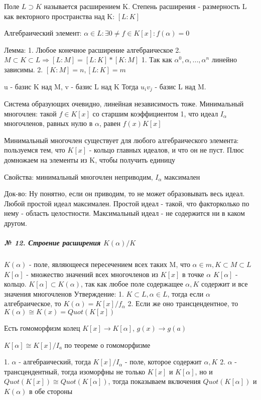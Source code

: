 \documentclass{article}
\begin{document}
\begin{flushleft}

Поле $L \supset K$ называется расширением K.
Степень расширения - размерность L как векторного пространства над K: $[L : K]$

Алгебраический элемент: $\alpha \in L : \exists 0 \neq f \in K[x] : f(\alpha) = 0$

Лемма:
1. Любое конечное расширение алгебраическое
2. $M \subset K \subset L \Rightarrow [L : M] = [L : K] * [K : M]$
1. Так как $\alpha^0, \alpha, ..., \alpha^n$ линейно зависимы.
2. $[K : M] = n, [L : K] = m$

u - базис K над M, v - базис L над K
Тогда $u_iv_j$ - базис L над M.

Система образующих очевидно, линейная независимость тоже.
Минимальный многочлен: такой $f \in K[x]$ со старшим коэффициентом 1, что идеал $I_\alpha$ многочленов, равных нулю в $\alpha$, равен $f(x)K[x]$

Минимальный многочлен существует для любого алгебраического элемента: пользуемся тем, что $K[x]$ - кольцо главных идеалов, и что он не пуст. Плюс домножаем на элементы из K, чтобы получить единицу

Свойства: минимальный многочлен неприводим, $I_\alpha$ максимален

Док-во: Ну понятно, если он приводим, то не может образовывать весь идеал. Любой простой идеал максимален.
Простой идеал - такой, что факторколько по нему - область целостности. 
Максимальный идеал - не содержится ни в каком другом.

\end{flushleft}


\subparagraph{\tiny № 12. Строение расширения $K(\alpha)/ K$}

\begin{flushleft}

$K(\alpha)$ - поле, являющееся пересечением всех таких M, что $\alpha \in m, K \subset M \subset L$
$K[\alpha]$ - множество значений всех многочленов из $K[x]$ в точке $\alpha$
$K[\alpha]$ - кольцо. $K[\alpha] \subset K(\alpha)$, так как любое поле содержащее ${\alpha, K}$ содержит и все значения многочленов
Утверждение:
1. $K \subset L, \alpha \in L$, тогда если $\alpha$ алгебраическое, то $K(\alpha) = K[x] / f_\alpha$
2. Если же оно трансцендентное, то $K(\alpha) \cong K(x) = Quot(K[x])$

Есть гомоморфизм колец $K[x] \rightarrow K[\alpha]$, $g(x) \rightarrow g(a)$

$K[\alpha] \cong K[x] / I_a$ по теореме о гомоморфизме

1. $\alpha$ - алгебраический, тогда $K[x] / I_\alpha$ - поле, которое содержит $\alpha, K$
2. $\alpha$ - трансцендентный, тогда изоморфны не только $K[x]$ и $K[\alpha]$, но и $Quot(K[x]) \cong Quot(K[\alpha])$, тогда показываем включения $Quot(K[\alpha])$ и $K(\alpha)$ в обе стороны

\end{flushleft}
\end{document}
